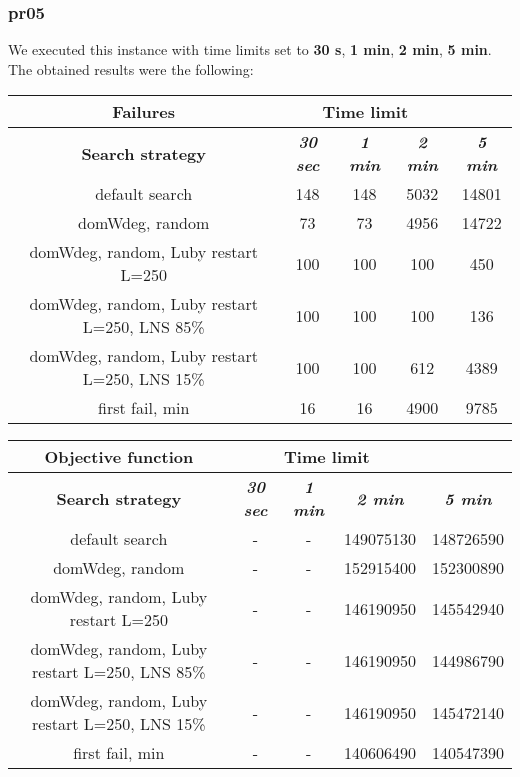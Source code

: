 \subsubsection{pr05}
We executed this instance with time limits set to \textbf{30 s}, \textbf{1 min}, \textbf{2 min}, \textbf{5 min}.\\
The obtained results were the following:
{
\renewcommand{\arraystretch}{2}
\begin{longtable}[h]{| c | c | c | c | c |}
    \hline
    \textbf{Failures} & \multicolumn{3}{c}{Time limit} & \\
    \hline
    \textbf{Search strategy} & \textbf{\textit{30 sec}} & \textbf{\textit{1 min}} & \textbf{\textit{2 min}} & \textbf{\textit{5 min}} \\
    \hline
    \endhead
    default search                                & 148 &  148 &  5032 &  14801 \\
    \hline
    domWdeg, random                               &  73 &   73 &  4956 &  14722 \\
    \hline
    domWdeg, random, Luby restart L=250           & 100 &  100 &   100 &    450 \\
    \hline
    domWdeg, random, Luby restart L=250, LNS 85\% & 100 &  100 &   100 &    136 \\
    \hline
    domWdeg, random, Luby restart L=250, LNS 15\% & 100 &  100 &   612 &   4389 \\
    \hline
    first fail, min                               &  16 &   16 &  4900 &   9785 \\
    \hline
\end{longtable}
}

{
\renewcommand{\arraystretch}{2}
\begin{longtable}[h]{| c | c | c | c | c |}
    \hline
    \textbf{Objective function} & \multicolumn{3}{c}{Time limit} & \\
    \hline
    \textbf{Search strategy} & \textbf{\textit{30 sec}} & \textbf{\textit{1 min}} & \textbf{\textit{2 min}} & \textbf{\textit{5 min}} \\
    \hline
    \endhead
    default search                                & - & - & 149075130 & 148726590 \\
    \hline
    domWdeg, random                               & - & - & 152915400 & 152300890 \\
    \hline
    domWdeg, random, Luby restart L=250           & - & - & 146190950 & 145542940 \\
    \hline
    domWdeg, random, Luby restart L=250, LNS 85\% & - & - & 146190950 & 144986790 \\
    \hline
    domWdeg, random, Luby restart L=250, LNS 15\% & - & - & 146190950 & 145472140 \\
    \hline
    first fail, min                               & - & - & 140606490 & 140547390 \\
    \hline
\end{longtable}
}